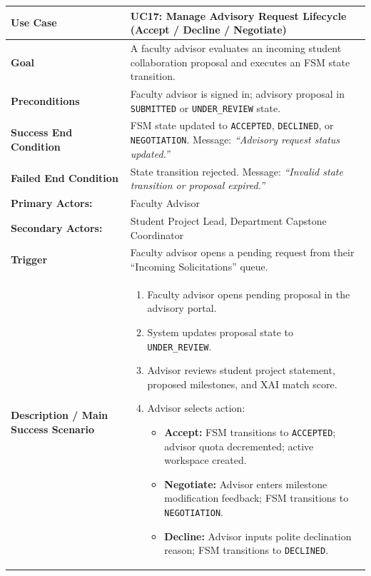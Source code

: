 \begin{table}[H]
\centering
\small
\begin{tabularx}{\textwidth}{|l|X|}
\hline
\rowcolor{lightgray!40} \textbf{Use Case} & \textbf{UC17: Manage Advisory Request Lifecycle (Accept / Decline / Negotiate)} \\ \hline
\textbf{Goal} & A faculty advisor evaluates an incoming student collaboration proposal and executes an FSM state transition. \\ \hline
\textbf{Preconditions} & Faculty advisor is signed in; advisory proposal in \texttt{SUBMITTED} or \texttt{UNDER\_REVIEW} state. \\ \hline
\textbf{Success End Condition} & FSM state updated to \texttt{ACCEPTED}, \texttt{DECLINED}, or \texttt{NEGOTIATION}. Message: \textit{``Advisory request status updated.''} \\ \hline
\textbf{Failed End Condition} & State transition rejected. Message: \textit{``Invalid state transition or proposal expired.''} \\ \hline
\textbf{Primary Actors:} & Faculty Advisor \\
\textbf{Secondary Actors:} & Student Project Lead, Department Capstone Coordinator \\ \hline
\textbf{Trigger} & Faculty advisor opens a pending request from their ``Incoming Solicitations'' queue. \\ \hline
\textbf{Description / Main Success Scenario} &
\begin{enumerate}[leftmargin=*]
    \item Faculty advisor opens pending proposal in the advisory portal.
    \item System updates proposal state to \texttt{UNDER\_REVIEW}.
    \item Advisor reviews student project statement, proposed milestones, and XAI match score.
    \item Advisor selects action:
    \begin{itemize}[leftmargin=*]
        \item \textbf{Accept:} FSM transitions to \texttt{ACCEPTED}; advisor quota decremented; active workspace created.
        \item \textbf{Negotiate:} Advisor enters milestone modification feedback; FSM transitions to \texttt{NEGOTIATION}.
        \item \textbf{Decline:} Advisor inputs polite declination reason; FSM transitions to \texttt{DECLINED}.
    \end{itemize}

\end{enumerate}
\end{tabularx}
\end{table}
